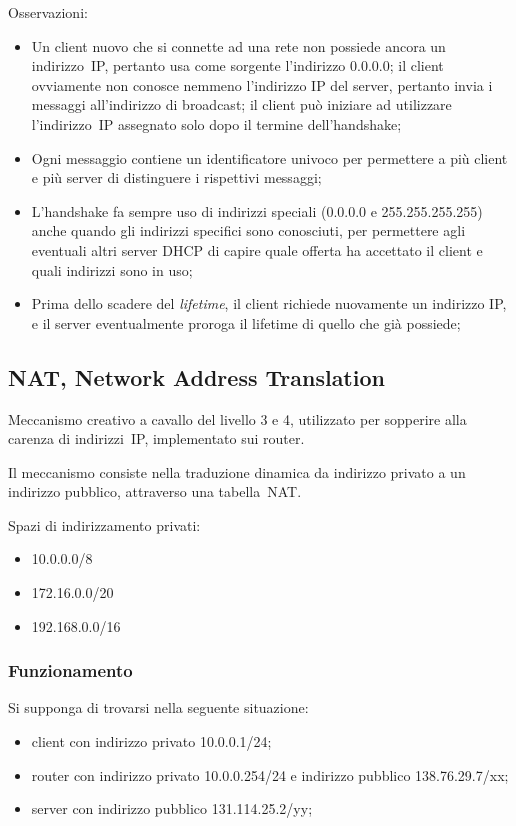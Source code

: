 \documentclass[12pt,a4paper]{article}
\begin{document}
Osservazioni:
\begin{itemize}
  \item Un client nuovo che si connette ad una rete non possiede ancora
    un indirizzo~IP, pertanto usa come sorgente l'indirizzo 0.0.0.0;
    il client ovviamente non conosce nemmeno l'indirizzo IP del server,
    pertanto invia i messaggi all'indirizzo di broadcast; il client
    può iniziare ad utilizzare l'indirizzo~IP assegnato solo dopo il
    termine dell'handshake;
  \item Ogni messaggio contiene un identificatore univoco per permettere
    a più client e più server di distinguere i rispettivi messaggi;
  \item L'handshake fa sempre uso di indirizzi speciali (0.0.0.0 e 255.255.255.255)
    anche quando gli indirizzi specifici sono conosciuti, per permettere
    agli eventuali altri server DHCP di capire quale offerta ha accettato
    il client e quali indirizzi sono in uso;
  \item Prima dello scadere del \emph{lifetime}, il client richiede
    nuovamente un indirizzo IP, e il server eventualmente proroga il
    lifetime di quello che già possiede;
\end{itemize}

\subsection{NAT, Network Address Translation}
Meccanismo creativo a cavallo del livello 3 e 4, utilizzato per sopperire
alla carenza di indirizzi~IP, implementato sui router.

Il meccanismo consiste nella traduzione dinamica da indirizzo privato
a un indirizzo pubblico, attraverso una tabella~NAT.

Spazi di indirizzamento privati:
\begin{itemize}
  \item 10.0.0.0/8
  \item 172.16.0.0/20
  \item 192.168.0.0/16
\end{itemize}

\subsubsection{Funzionamento}
Si supponga di trovarsi nella seguente situazione:
\begin{itemize}
  \item client con indirizzo privato 10.0.0.1/24;
  \item router con indirizzo privato 10.0.0.254/24 e indirizzo pubblico
    138.76.29.7/xx;
  \item server con indirizzo pubblico 131.114.25.2/yy;
\end{itemize}
\end{document}
